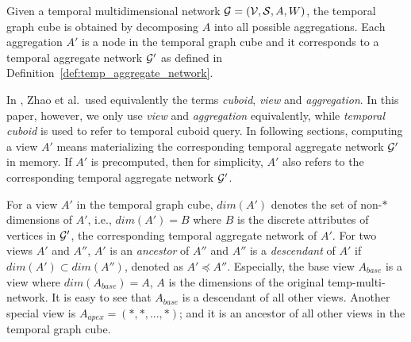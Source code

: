 \documentclass[10pt,journal,compsoc]{IEEEtran}
\begin{document}

\begin{definition}
	\label{def:temp_graph_cube}
	Given a temporal multidimensional network $\mathcal{G}=(\mathcal{V},\mathcal{S},A,W)$, the temporal graph cube is obtained by decomposing $ A $ into all possible aggregations. Each aggregation $ A' $ is a node in the temporal graph cube and it corresponds to a temporal aggregate network $ \mathcal{G}' $ as defined in Definition~\ref{def:temp_aggregate_network}.
\end{definition}

In \cite{zhao2011graph}, Zhao et al.\ used equivalently the terms \textit{cuboid}, \textit{view} and \textit{aggregation}. In this paper, however, we only use \textit{view} and \textit{aggregation} equivalently, while \textit{temporal cuboid} is used to refer to temporal cuboid query. In following sections, computing a view $ A' $ means materializing the corresponding temporal aggregate network $ \mathcal{G}' $ in memory. If $ A' $ is precomputed, then for simplicity, $ A' $ also refers to the corresponding temporal aggregate network $ \mathcal{G}' $.

For a view $ A' $ in the temporal graph cube, $ dim(A') $ denotes the set of non-$\ast$ dimensions of $ A' $, i.e., $ dim(A')=B $ where $ B $ is the discrete attributes of vertices in $ \mathcal{G}' $, the corresponding temporal aggregate network of $ A' $. For two views $ A' $ and $ A'' $, $ A' $ is an \textit{ancestor} of $ A'' $ and $ A'' $ is a \textit{descendant} of $ A' $ if $ dim(A') \subset dim(A'') $, denoted as $ A' \preceq A'' $. Especially, the base view $ A_{base} $ is a view where $ dim(A_{base})=A $, $ A $ is the dimensions of the original temp-multi-network. It is easy to see that $ A_{base} $ is a descendant of all other views. Another special view is $ A_{apex}=(\ast,\ast,...,\ast) $; and it is an ancestor of all other views in the temporal graph cube. %
\end{document}

